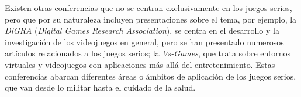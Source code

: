 Existen otras conferencias que no se centran exclusivamente en los juegos
serios, pero que por su naturaleza incluyen presentaciones sobre el tema, por
ejemplo, la \emph{DiGRA} (\textit{Digital Games Research Association}), se
centra en el desarrollo y la investigación de los videojuegos en general, pero
se han presentado numerosos artículos relacionados a  los juegos serios; la
\emph{Vs-Games}, que trata sobre entornos virtuales y videojuegos con
aplicaciones más allá del entretenimiento. Estas conferencias abarcan diferentes
áreas o ámbitos de aplicación de los juegos serios, que van desde lo militar
hasta el cuidado de la salud.


